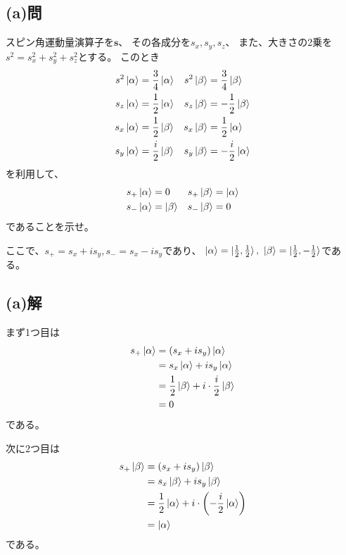 \subsection{(a)問}
スピン角運動量演算子を$\bm{s}$、
その各成分を$s_x,s_y,s_z$、
また、大きさの2乗を$s^2=s_x^2+s_y^2+s_z^2$とする。
このとき
\begin{align}
	s^2 \ket{\alpha}
&=
	\frac{3}{4} \ket{\alpha} &
%
	s^2 \ket{\beta}
&=
	\frac{3}{4} \ket{\beta} \\
%
%
	s_z \ket{\alpha}
&=
	\frac{1}{2} \ket{\alpha} &
%
	s_z \ket{\beta}
&=
	-\frac{1}{2} \ket{\beta} \\
%
%
	s_x \ket{\alpha}
&=
	\frac{1}{2} \ket{\beta} &
%
	s_x \ket{\beta}
&=
	\frac{1}{2} \ket{\alpha} \\
%
%
	s_y \ket{\alpha}
&=
	\frac{i}{2} \ket{\beta} &
%
	s_y \ket{\beta}
&=
	-\frac{i}{2} \ket{\alpha}
\end{align}
を利用して、
\begin{align}
	s_+ \ket{\alpha}
&=
	0 &
%
	s_+ \ket{\beta}
&=
	\ket{\alpha} \\
%
%
	s_- \ket{\alpha}
&=
	\ket{\beta} &
%
	s_- \ket{\beta}
&=
	0
\end{align}
であることを示せ。

ここで、$s_+=s_x+is_y, s_-=s_x-is_y$であり、
$\ket{\alpha}=\ket{\frac{1}{2},\frac{1}{2}},\
\ket{\beta}=\ket{\frac{1}{2},-\frac{1}{2}}$である。


\subsection{(a)解}
まず1つ目は
\begin{align}
	s_+ \ket{\alpha}
&=
	(s_x +is_y) \ket{\alpha} \\
%
%
&=
	s_x \ket{\alpha}
	+
	i s_y \ket{\alpha} \\
%
%
&=
	\frac{1}{2} \ket{\beta}
	+
	i \cdot\frac{i}{2} \ket{\beta} \\
%
%
&=
	0
\end{align}
である。

次に2つ目は
\begin{align}
	s_+ \ket{\beta}
&=
	(s_x +is_y) \ket{\beta} \\
%
%
&=
	s_x \ket{\beta}
	+
	i s_y \ket{\beta} \\
%
%
&=
	\frac{1}{2} \ket{\alpha}
	+
	i \cdot\left(-\frac{i}{2}\ket{\alpha}\right) \\
%
%
&=
	\ket{\alpha}
\end{align}
である。

